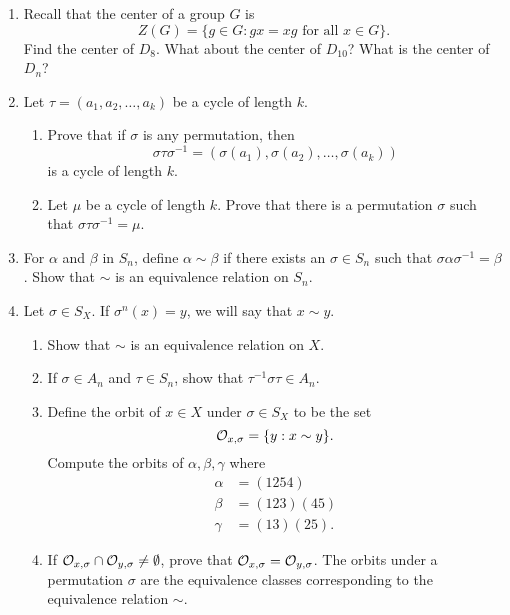 {\begin{enumerate}
 
\item
Recall that the {\bfi center} of a group $G$ is
\[
Z(G) = \{ g \in G : \mbox{$gx = xg$ for all $x \in G$} \}.
\]
Find the center of $D_8$. What about the center of $D_{10}$? What is
the center of $D_n$? 
 
 
\item
Let $\tau = (a_1, a_2, \ldots, a_k)$ be a cycle of length $k$.
\begin{enumerate}
 
 \item
Prove that if $\sigma$ is any permutation, then
\[
\sigma \tau \sigma^{-1 } = ( \sigma(a_1), \sigma(a_2), \ldots,
\sigma(a_k))
\]
is a cycle of length $k$.
 
 \item
Let $\mu$ be a cycle of length $k$. Prove that there is a permutation
$\sigma$ such that $\sigma \tau \sigma^{-1 } = \mu$.
 
\end{enumerate}
 
 
\item
For $\alpha$ and $\beta$ in $S_n$, define $\alpha \sim \beta$ if there
exists an $\sigma \in S_n$ such that $\sigma \alpha \sigma^{-1} =
\beta$.  Show that $\sim$ is an equivalence relation on $S_n$.
 
 
\item
Let $\sigma \in S_X$. If $\sigma^n(x) = y$, we will say that $x \sim
y$. 
\begin{enumerate}
 
 \item
Show that $\sim$ is an equivalence relation on $X$.
 
 \item
If $\sigma \in A_n$ and $\tau \in S_n$, show that $\tau^{-1} \sigma
\tau \in A_n$. 
 
\item
Define the {\bfi orbit} of $x \in X$ under $\sigma \in
S_X$ to be the set 
\[
{\cal O}_{x, \sigma} = \{ y : x \sim y  \}.
\]
Compute the orbits of $\alpha, \beta, \gamma$ where
\begin{align*}
\alpha & = (1254) \\
\beta & = (123)(45)\\
\gamma & = (13)(25).
\end{align*}
 
 \item
If ${\cal O}_{x, \sigma} \cap {\cal O}_{y, \sigma} \neq \emptyset$,
prove that ${\cal O}_{x, \sigma} = {\cal O}_{y, \sigma}$.  The orbits
under a permutation $\sigma$ are the equivalence classes corresponding
to the equivalence relation $\sim$.
 

\end{enumerate}
\end{enumerate}}
